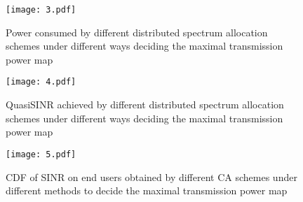  \begin{figure}[h!]
    \centering
      \texttt{[image: 3.pdf]}
    \caption{Power consumed by different distributed spectrum allocation schemes under different ways deciding the maximal transmission power map}
\label{sim:group1_power}    
  \end{figure}
  
   \begin{figure}[h!]
       \centering
       \texttt{[image: 4.pdf]}
       \caption{QuasiSINR achieved by different distributed spectrum allocation schemes under different ways deciding the maximal transmission power map}
	\label{sim:group1_qsinr}       
     \end{figure}
  
 
  \begin{figure}[h!]
     \centering
     \texttt{[image: 5.pdf]}
     \caption{CDF of SINR on end users obtained by different CA schemes under different methods to decide the maximal transmission power map}
\label{group1_sinr}     
   \end{figure}

